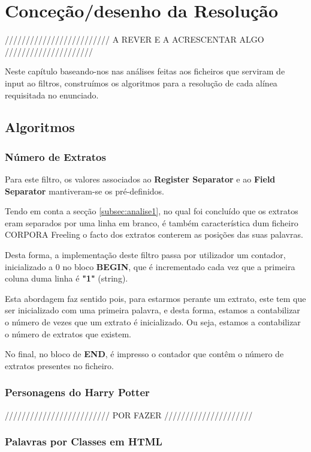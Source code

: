 \documentclass[11pt,a4paper]{report}
\begin{document}
\chapter{Conceção/desenho da Resolução}
\label{chap:concecao}

///////////////////////// A REVER E A ACRESCENTAR ALGO /////////////////////

Neste capítulo baseando-nos nas análises feitas aos ficheiros que serviram de input ao filtros, construímos os algoritmos para a resolução de cada alínea requisitada no enunciado.

\section{Algoritmos}
\subsection{Número de Extratos}
\label{subsec:algoritmos1}

Para este filtro, os valores associados ao \textbf{Register Separator} e ao \textbf{Field Separator} mantiveram-se os pré-definidos.

Tendo em conta a secção \ref{subsec:analise1}, no qual foi concluído que os extratos eram separados por uma linha em branco, é também característica dum ficheiro CORPORA Freeling o facto dos extratos conterem as posições das suas palavras.

Desta forma, a implementação deste filtro passa por utilizador um contador, inicializado a 0 no bloco \textbf{BEGIN}, que é incrementado cada vez que a primeira coluna duma linha é \textbf{"1"} (string).

Esta abordagem faz sentido pois, para estarmos perante um extrato, este tem que ser inicializado com uma primeira palavra, e desta forma, estamos a contabilizar o número de vezes que um extrato é inicializado. Ou seja, estamos a contabilizar o número de extratos que existem.

No final, no bloco de \textbf{END}, é impresso o contador que contêm o número de extratos presentes no ficheiro.


\subsection{Personagens do Harry Potter}
\label{sub:algoritmos2}

///////////////////////// POR FAZER /////////////////////


\subsection{Palavras por Classes em HTML}
\label{sub:algoritmos3}
\end{document}

